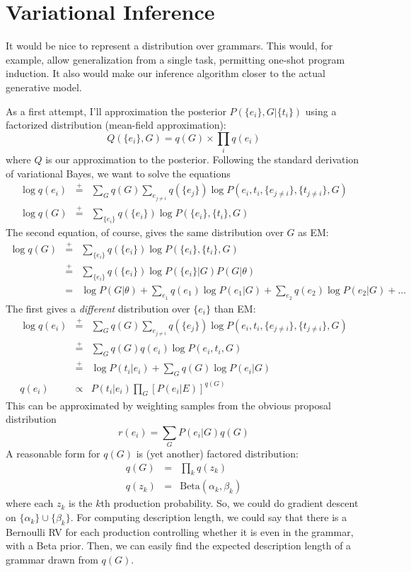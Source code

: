 \documentclass[12pt]{article}
\begin{document}
\section{Variational Inference}
It would be nice to represent a distribution over grammars.
This would, for example, allow generalization from a single task, permitting one-shot program induction.
It also would make our inference algorithm closer to the actual generative model.

As a first attempt, I'll approximation the posterior $P(\{e_i\},G | \{t_i\})$ using a factorized distribution (mean-field approximation):
$$
Q(\{e_i\},G) = q(G) \times \prod_i q(e_i) 
$$
where $Q$ is our approximation to the posterior.
Following the standard derivation of variational Bayes, we want to solve the equations
\begin{eqnarray*}
\log q(e_i) &\stackrel{+}{=}& \sum_G q(G)\sum_{e_{j\not= i}} q(\{e_j\}) \log P(e_i, t_i, \{e_{j\not= i}\}, \{t_{j\not= i}\}, G) \\
\log q(G) &\stackrel{+}{=}& \sum_{\{e_i\}} q(\{e_i\}) \log P(\{e_i\}, \{t_i\}, G )
\end{eqnarray*}
The second equation, of course, gives the same distribution over $G$ as EM:
\begin{eqnarray*}
\log q(G) &\stackrel{+}{=}& \sum_{\{e_i\}} q(\{e_i\}) \log P(\{e_i\}, \{t_i\}, G )\\
 &\stackrel{+}{=}& \sum_{\{e_i\}} q(\{e_i\}) \log P(\{e_i\} | G )P(G|\theta)\\
 &=& \log P(G|\theta) + \sum_{e_1} q(e_1)\log P(e_1 | G) + \sum_{e_2} q(e_2)\log P(e_2 | G)+...
\end{eqnarray*}
The first gives a \emph{different} distribution over $\{e_i\}$ than EM:
\begin{eqnarray*}
\log q(e_i) &\stackrel{+}{=}& \sum_G q(G)\sum_{e_{j\not= i}} q(\{e_j\}) \log P(e_i, t_i, \{e_{j\not= i}\}, \{t_{j\not= i}\}, G) \\
&\stackrel{+}{=}& \sum_G q(G) q(e_i) \log P(e_i, t_i, G) \\
&\stackrel{+}{=}& \log P(t_i | e_i) + \sum_G q(G) \log P(e_i | G) \\
q(e_i) &\propto& P(t_i | e_i) \prod_G \left[ P(e_i | E)\right]^{q(G)}
\end{eqnarray*}
This can be approximated by weighting samples from the obvious proposal distribution
$$
r(e_i) = \sum_G P(e_i | G) q(G)
$$
A reasonable form for $q(G)$ is (yet another) factored distribution:
\begin{eqnarray*}
q(G) &=& \prod_k q(z_k)\\
q(z_k) &=& \mbox{Beta}(\alpha_k, \beta_k)
\end{eqnarray*}
where each $z_k$ is the $k$th production probability.
So, we could do gradient descent on  $\{\alpha_k\}\cup\{\beta_k\}$.
For computing description length, we could say that there is a Bernoulli RV for each production controlling whether it is even in the grammar, with a Beta prior.
Then, we can easily find the expected description length of a grammar drawn from $q(G)$.
\end{document}
